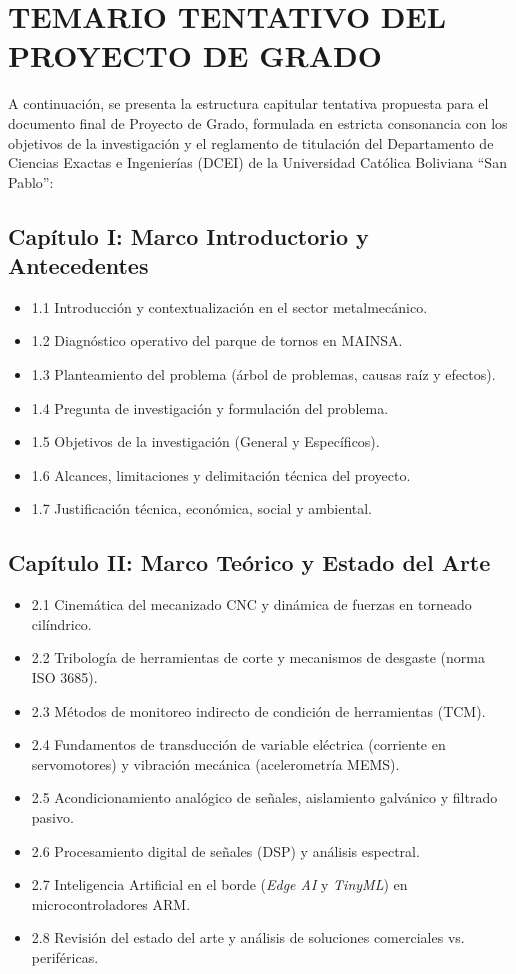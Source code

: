 \newpage
\section{TEMARIO TENTATIVO DEL PROYECTO DE GRADO}

A continuación, se presenta la estructura capitular tentativa propuesta para el documento final de Proyecto de Grado, formulada en estricta consonancia con los objetivos de la investigación y el reglamento de titulación del Departamento de Ciencias Exactas e Ingenierías (DCEI) de la Universidad Católica Boliviana ``San Pablo'':

\subsection*{Capítulo I: Marco Introductorio y Antecedentes}
\begin{itemize}
    \item 1.1 Introducción y contextualización en el sector metalmecánico.
    \item 1.2 Diagnóstico operativo del parque de tornos en MAINSA.
    \item 1.3 Planteamiento del problema (árbol de problemas, causas raíz y efectos).
    \item 1.4 Pregunta de investigación y formulación del problema.
    \item 1.5 Objetivos de la investigación (General y Específicos).
    \item 1.6 Alcances, limitaciones y delimitación técnica del proyecto.
    \item 1.7 Justificación técnica, económica, social y ambiental.
\end{itemize}

\subsection*{Capítulo II: Marco Teórico y Estado del Arte}
\begin{itemize}
    \item 2.1 Cinemática del mecanizado CNC y dinámica de fuerzas en torneado cilíndrico.
    \item 2.2 Tribología de herramientas de corte y mecanismos de desgaste (norma ISO 3685).
    \item 2.3 Métodos de monitoreo indirecto de condición de herramientas (TCM).
    \item 2.4 Fundamentos de transducción de variable eléctrica (corriente en servomotores) y vibración mecánica (acelerometría MEMS).
    \item 2.5 Acondicionamiento analógico de señales, aislamiento galvánico y filtrado pasivo.
    \item 2.6 Procesamiento digital de señales (DSP) y análisis espectral.
    \item 2.7 Inteligencia Artificial en el borde (\textit{Edge AI} y \textit{TinyML}) en microcontroladores ARM.
    \item 2.8 Revisión del estado del arte y análisis de soluciones comerciales vs. periféricas.
\end{itemize}

